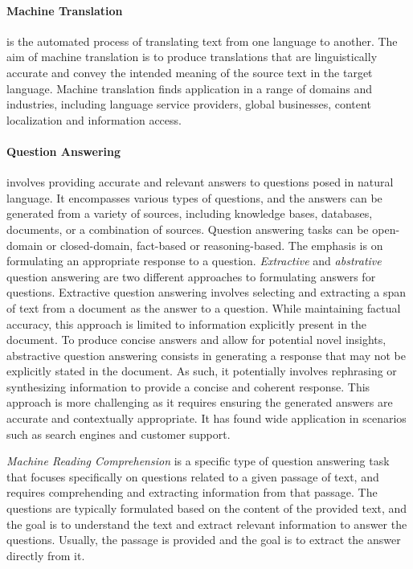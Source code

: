 \paragraph{Machine Translation} is the automated process of translating text from one language to another. The aim of machine translation is to produce translations that are linguistically accurate and convey the intended meaning of the source text in the target language. Machine translation finds application in a range of domains and industries, including language service providers, global businesses, content localization and information access. 

\paragraph{Question Answering} involves providing accurate and relevant answers to questions posed in natural language. It encompasses various types of questions, and the answers can be generated from a variety of sources, including knowledge bases, databases, documents, or a combination of sources. Question answering tasks can be open-domain or closed-domain, fact-based or reasoning-based. The emphasis is on formulating an appropriate response to a question. \textit{Extractive} and \textit{abstrative} question answering are two different approaches to formulating answers for questions. Extractive question answering involves selecting and extracting a span of text from a document as the answer to a question. While maintaining factual accuracy, this approach is limited to information explicitly present in the document. To produce concise answers and allow for potential novel insights, abstractive question answering consists in generating a response that may not be explicitly stated in the document. As such, it potentially involves rephrasing or synthesizing information to provide a concise and coherent response. This approach is more challenging as it requires ensuring the generated answers are accurate and contextually appropriate. It has found wide application in scenarios such as search engines and customer support.

\textit{Machine Reading Comprehension} is a specific type of question answering task that focuses specifically on questions related to a given passage of text, and requires comprehending and extracting information from that passage. The questions are typically formulated based on the content of the provided text, and the goal is to understand the text and extract relevant information to answer the questions. Usually, the passage is provided and the goal is to extract the answer directly from it.

